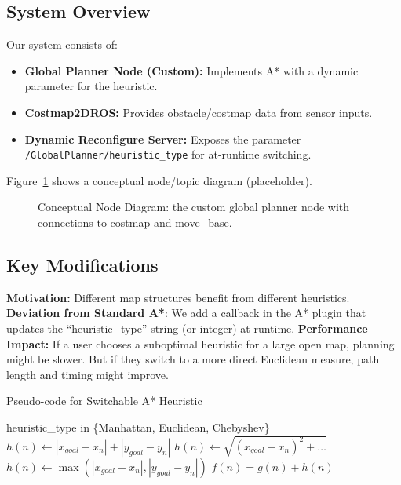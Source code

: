 \documentclass[letterpaper, 10 pt, conference]{ieeeconf}
\begin{document}
\subsection{System Overview}
Our system consists of:
\begin{itemize}
    \item \textbf{Global Planner Node (Custom):} Implements A* with a dynamic 
    parameter for the heuristic.
    \item \textbf{Costmap2DROS:} Provides obstacle/costmap data from sensor inputs.
    \item \textbf{Dynamic Reconfigure Server:} Exposes the parameter 
    \texttt{/GlobalPlanner/heuristic\_type} for at-runtime switching.
\end{itemize}

Figure~\ref{fig:rqt_graph} shows a conceptual node/topic diagram (placeholder).

\begin{figure}[!ht]
    \centering
    \caption{Conceptual Node Diagram: the custom global planner node 
    with connections to costmap and move\_base.}
    \label{fig:rqt_graph}
\end{figure}

\subsection{Key Modifications}
\textbf{Motivation:} 
Different map structures benefit from different heuristics.  
\textbf{Deviation from Standard A*}: 
We add a callback in the A* plugin that updates the “heuristic\_type” string 
(or integer) at runtime.  
\textbf{Performance Impact:} 
If a user chooses a suboptimal heuristic for a large open map, planning might 
be slower. But if they switch to a more direct Euclidean measure, path length 
and timing might improve.

\begin{algorithm}[H]
\caption{Pseudo-code for Switchable A* Heuristic}
\label{alg:alg2}
\begin{algorithmic}[1]
\REQUIRE heuristic\_type in \{Manhattan, Euclidean, Chebyshev\}
    \STATE $h(n) \leftarrow |x_{goal} - x_n| + |y_{goal} - y_n|$
    \STATE $h(n) \leftarrow \sqrt{(x_{goal}-x_n)^2 + \dots}$
    \STATE $h(n) \leftarrow \max(|x_{goal}-x_n|,|y_{goal}-y_n|)$
\ENDIF
\RETURN $f(n) = g(n) + h(n)$
\end{algorithmic}
\end{algorithm}
\end{document}
